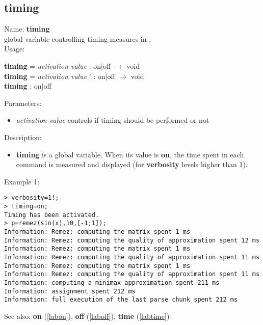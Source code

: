 \subsection{timing}
\label{labtiming}
\noindent Name: \textbf{timing}\\
global variable controlling timing measures in \sollya.\\
\noindent Usage: 
\begin{center}
\textbf{timing} = \emph{activation value} : \textsf{on$|$off} $\rightarrow$ \textsf{void}\\
\textbf{timing} = \emph{activation value} ! : \textsf{on$|$off} $\rightarrow$ \textsf{void}\\
\textbf{timing} : \textsf{on$|$off}\\
\end{center}
Parameters: 
\begin{itemize}
\item \emph{activation value} controls if timing should be performed or not
\end{itemize}
\noindent Description: \begin{itemize}

\item \textbf{timing} is a global variable. When its value is \textbf{on}, the time spent in each 
   command is measured and displayed (for \textbf{verbosity} levels higher than 1).
\end{itemize}
\noindent Example 1: 
\begin{center}\begin{minipage}{15cm}\begin{Verbatim}[frame=single]
> verbosity=1!;
> timing=on;
Timing has been activated.
> p=remez(sin(x),10,[-1;1]);
Information: Remez: computing the matrix spent 1 ms
Information: Remez: computing the quality of approximation spent 12 ms
Information: Remez: computing the matrix spent 1 ms
Information: Remez: computing the quality of approximation spent 11 ms
Information: Remez: computing the matrix spent 1 ms
Information: Remez: computing the quality of approximation spent 11 ms
Information: computing a minimax approximation spent 211 ms
Information: assignment spent 212 ms
Information: full execution of the last parse chunk spent 212 ms
\end{Verbatim}
\end{minipage}\end{center}
See also: \textbf{on} (\ref{labon}), \textbf{off} (\ref{laboff}), \textbf{time} (\ref{labtime})
